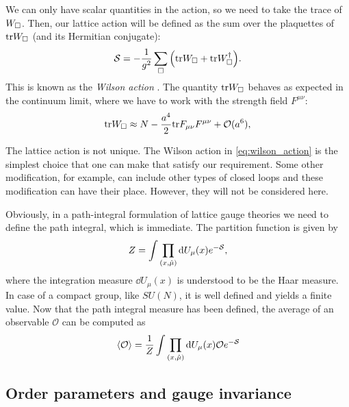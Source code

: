 We can only have scalar quantities in the action, so we need to take the trace of $W_{\square}$.
Then, our lattice action will be defined as the sum over the plaquettes of $\text{tr} W_{\square}$ (and its Hermitian conjugate):
\begin{equation}
    \mathcal{S} = - \frac{1}{g^2} \sum_{\square} \qty( \text{tr} W_{\square} + \text{tr} W_{\square}^{\dagger} ).
    \label{eq:wilson_action}
\end{equation}
This is known as the \emph{Wilson action} \citneeded.
The quantity $\text{tr} W_{\square}$ behaves as expected in the continuum limit, where we have to work with the strength field $F^{\mu \nu}$:
\begin{equation}
    \text{tr} W_{\square} \approx N - \frac{a^{4}}{2} \text{tr} F_{\mu \nu} F^{\mu \nu} + \mathcal{O}(a^6),
\end{equation}

The lattice action is not unique.
The Wilson action in \eqref{eq:wilson_action} is the simplest choice that one can make that satisfy our requirement.
Some other modification, for example, can include other types of closed loops and these modification can have their place.
However, they will not be considered here.

Obviously, in a path-integral formulation of lattice gauge theories we need to define the path integral, which is immediate.
The partition function is given by
\begin{equation}
    Z = \int \prod_{(x, \hat{\mu})}  \text{d} U_{\mu}(x) e^{- \mathcal{S}},
\end{equation}
where the integration measure $\dd U_{\mu}(x)$ is understood to be the Haar measure.
In case of a compact group, like $SU(N)$, it is well defined and yields a finite value.
Now that the path integral measure has been defined, the average of an observable $\mathcal{O}$ can be computed as
\begin{equation}
    \ev*{\mathcal{O}} = \frac{1}{Z} \int \prod_{(x, \hat{\mu})} \dd U_{\mu}(x) \mathcal{O} e^{- \action}
\end{equation}


%
%
\subsection{Order parameters and gauge invariance}
\label{sub:wilson_confinement_test}

